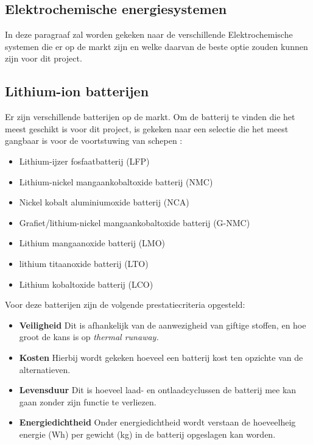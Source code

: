 \subsection{Elektrochemische energiesystemen}
In deze paragraaf zal worden gekeken naar de verschillende Elektrochemische systemen die er op de markt zijn en welke daarvan de beste optie zouden kunnen zijn voor dit project.


\subsection*{Lithium-ion batterijen}
Er zijn verschillende batterijen op de markt. Om de batterij te vinden die het meest geschikt is voor dit project, is gekeken naar een selectie die het meest gangbaar is voor de voortstuwing van schepen \cite{Szewczyk2023}:
\begin{itemize}
    \item Lithium-ijzer fosfaatbatterij (LFP)
    \item Lithium-nickel mangaankobaltoxide batterij (NMC)
    \item Nickel kobalt aluminiumoxide batterij (NCA)
    \item Grafiet/lithium-nickel mangaankobaltoxide batterij (G-NMC)
    \item Lithium mangaanoxide batterij (LMO)
    \item lithium titaanoxide batterij (LTO)
    \item Lithium kobaltoxide  batterij (LCO)
\end{itemize}

\noindent Voor deze batterijen zijn de volgende prestatiecriteria opgesteld:

\begin{itemize}
    \item \textbf{Veiligheid} Dit is afhankelijk van de aanwezigheid van giftige stoffen, en hoe groot de kans is op \textit{thermal runaway.}
    \item \textbf{Kosten} Hierbij wordt gekeken hoeveel een batterij kost ten opzichte van de alternatieven.
    \item \textbf{Levensduur} Dit is hoeveel laad- en ontlaadcyclussen de batterij mee kan gaan zonder zijn functie te verliezen.
    \item \textbf{Energiedichtheid} Onder energiedichtheid wordt verstaan de hoeveelheig energie (Wh) per gewicht (kg) in de batterij opgeslagen kan worden.
\end{itemize}




